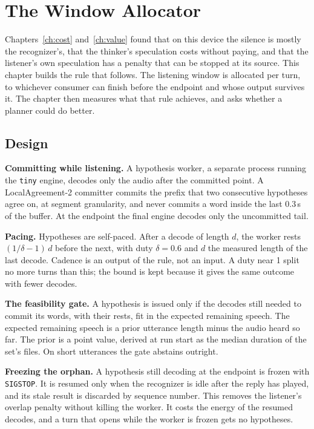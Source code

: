 \chapter{The Window Allocator}
\label{ch:allocator}

Chapters~\ref{ch:cost} and~\ref{ch:value} found that on this device the
silence is mostly the recognizer's, that the thinker's speculation costs
without paying, and that the listener's own speculation has a penalty that can
be stopped at its source. This chapter builds the rule that follows. The
listening window is allocated per turn, to whichever consumer can finish
before the endpoint and whose output survives it. The chapter then measures
what that rule achieves, and asks whether a planner could do better.

\section{Design}
\label{sec:design}

\textbf{Committing while listening.} A hypothesis worker, a separate process
running the \texttt{tiny} engine, decodes only the audio after the committed
point. A LocalAgreement-2 committer \cite{machacek2023whisperstreaming}
commits the prefix that two consecutive hypotheses agree on, at segment
granularity, and never commits a word inside the last 0.3\,s of the buffer.
At the endpoint the final engine decodes only the uncommitted tail.

\textbf{Pacing.} Hypotheses are self-paced. After a decode of length $d$, the
worker rests $(1/\delta - 1)\,d$ before the next, with duty $\delta = 0.6$ and
$d$ the measured length of the last decode. Cadence is an output of the rule,
not an input. A duty near 1 split no more turns than this; the bound is kept
because it gives the same outcome with fewer decodes.

\textbf{The feasibility gate.} A hypothesis is issued only if the decodes
still needed to commit its words, with their rests, fit in the expected
remaining speech. The expected remaining speech is a prior utterance length
minus the audio heard so far. The prior is a point value, derived at run start
as the median duration of the set's files. On short utterances the gate
abstains outright.

\textbf{Freezing the orphan.} A hypothesis still decoding at the endpoint is
frozen with \texttt{SIGSTOP}. It is resumed only when the recognizer is idle
after the reply has played, and its stale result is discarded by sequence
number. This removes the listener's overlap penalty without killing the
worker. It costs the energy of the resumed decodes, and a turn that opens
while the worker is frozen gets no hypotheses.

